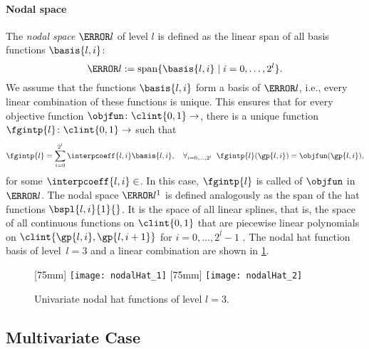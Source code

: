 \paragraph{Nodal space}

The \emph{nodal space} $\ns{l}$ of level $l$
is defined as the linear span of all basis functions
$\basis{l,i}$:
\begin{equation}
  \ns{l} := \spn\{\basis{l,i} \mid i = 0, \dotsc, 2^l\}.
\end{equation}
We assume that the functions $\basis{l,i}$ form a basis of $\ns{l}$, i.e.,
every linear combination of these functions is unique.
This ensures that for every objective function $\objfun\colon \clint{0, 1} \to \real$,
there is a unique function $\fgintp{l}\colon \clint{0, 1} \to \real$ such that
\begin{equation}
  \label{eq:interpFullGridUV}
  \fgintp{l}
  = \sum_{i=0}^{2^l} \interpcoeff{l,i} \basis{l,i},\quad
  \falarge{i = 0, \dotsc, 2^l}{\fgintp{l}(\gp{l,i}) = \objfun(\gp{l,i})},
\end{equation}
for some $\interpcoeff{l,i} \in \real$.
In this case, $\fgintp{l}$ is called  of $\objfun$ in $\ns{l}$.
The nodal space $\ns{l}^1$ is defined analogously as the span of the
hat functions $\bspl{l,i}{1}{}$.
It is the space of all linear splines,
that is, the space of all continuous functions on $\clint{0, 1}$ that are
piecewise linear polynomials on $\clint{\gp{l,i}, \gp{l,i+1}}$ for
$i = 0, \dotsc, 2^l - 1$ \cite{Hoellig13Approximation}.
The nodal hat function basis of level~$l = 3$
and a linear combination are shown in \cref{fig:nodalHat}.

\begin{figure}
  [75mm]{%
    \texttt{[image: nodalHat\_1]}%
  }%
  \hfill%
  [75mm]{%
    \texttt{[image: nodalHat\_2]}%
  }%
  \caption[%
    Univariate nodal hat functions%
  ]{%
    Univariate nodal hat functions of level $l = 3$.%
  }%
  \label{fig:nodalHat}%
\end{figure}



\subsection{Multivariate Case}
\label{sec:212nodalMV}

